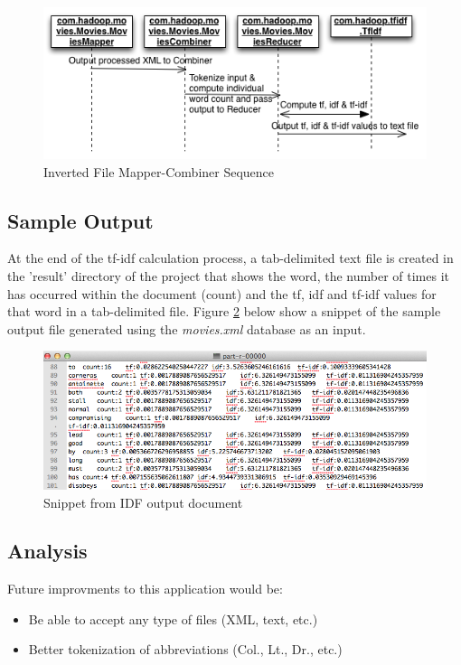 \documentclass[IDF.tex]{subfiles}
\begin{document}
\begin{figure}[H]
	\centering
	\includegraphics[width=1\textwidth]{./Figures/InvFilePrjMapCombiner.png}
	\caption{Inverted File Mapper-Combiner Sequence}
	\label{fig:invmapcombinered}
\end{figure}

\subsection{Sample Output}
At the end of the tf-idf calculation process, a tab-delimited text file is created in the 'result' directory of the project that shows the word, the number of times it has occurred within the document (count) and the tf, idf and tf-idf values for that word in a tab-delimited file. Figure \ref{fig:idfsnip} below show a snippet of the sample output file generated using the \textit{movies.xml} database as an input.

\begin{figure}[H]
	\centering
	\includegraphics[width=1\textwidth]{./Figures/idfsnip.png}
	\caption{Snippet from IDF output document}
	\label{fig:idfsnip}
\end{figure}

\subsection{Analysis}
Future improvments to this application would be:
\begin{itemize}
\item Be able to accept any type of files (XML, text, etc.)
\item Better tokenization of abbreviations (Col., Lt., Dr., etc.)
\end{itemize}
\end{document}
